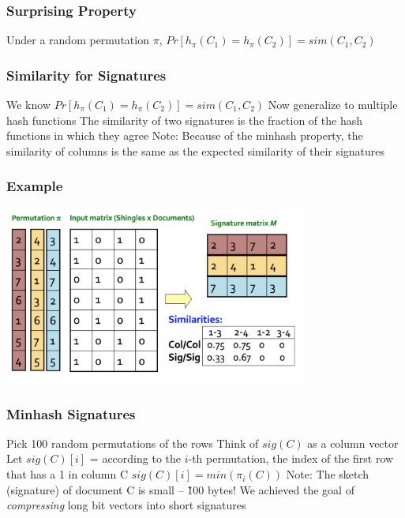 \documentclass[svgnames]{beamer}
\begin{document}
  
\begin{frame} \frametitle{Surprising Property}

Under a random permutation $\pi$, $Pr[h_\pi(C_1) = h_\pi(C_2)] = sim(C_1, C_2)$

\end{frame}

  
\begin{frame} \frametitle{Similarity for Signatures}

We know $Pr[h_\pi(C_1) = h_\pi(C_2)] = sim(C_1, C_2)$
Now generalize to multiple hash functions
The similarity of two signatures is the fraction of the hash functions in which they agree
Note: Because of the minhash property, the similarity of columns is the same as the expected similarity of their signatures

\end{frame}

  
\begin{frame} \frametitle{Example}

\includegraphics[width=10cm]{example}

\end{frame}

  
\begin{frame} \frametitle{Minhash Signatures}

Pick 100 random permutations of the rows
Think of $sig(C)$ as a column vector
Let $sig(C)[i]$ = according to the $i$-th permutation, the index of the first row that has a 1 in column C
   $sig(C)[i] = min (\pi_i(C))$
Note: The sketch (signature) of document C is small -- \~100 bytes!
We achieved the goal of \emph{compressing} long bit vectors into short signatures

\end{frame}
\end{document}
